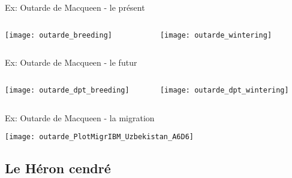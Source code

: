 \documentclass[]{beamer}
\begin{document}
\begin{frame}{Ex: Outarde de Macqueen - le présent}
  \begin{columns}
    \begin{column}[c]{0.5\textwidth}
      \texttt{[image: outarde\_breeding]}
    \end{column}
    \begin{column}[l]{0.5\textwidth}
      \begin{center}
        \texttt{[image: outarde\_wintering]} 
      \end{center}
    \end{column}
  \end{columns}
\end{frame}
\begin{frame}{Ex: Outarde de Macqueen - le futur}
  \begin{columns}
    \begin{column}[c]{0.5\textwidth}
      \texttt{[image: outarde\_dpt\_breeding]}
    \end{column}
    \begin{column}[l]{0.5\textwidth}
      \begin{center}
        \texttt{[image: outarde\_dpt\_wintering]} 
      \end{center}
    \end{column}
  \end{columns}
\end{frame}

\begin{frame}{Ex: Outarde de Macqueen - la migration}
  \begin{center}
    \texttt{[image: outarde\_PlotMigrIBM\_Uzbekistan\_A6D6]}
  \end{center}
\end{frame}



\subsection{Le Héron cendré}
\end{document}
